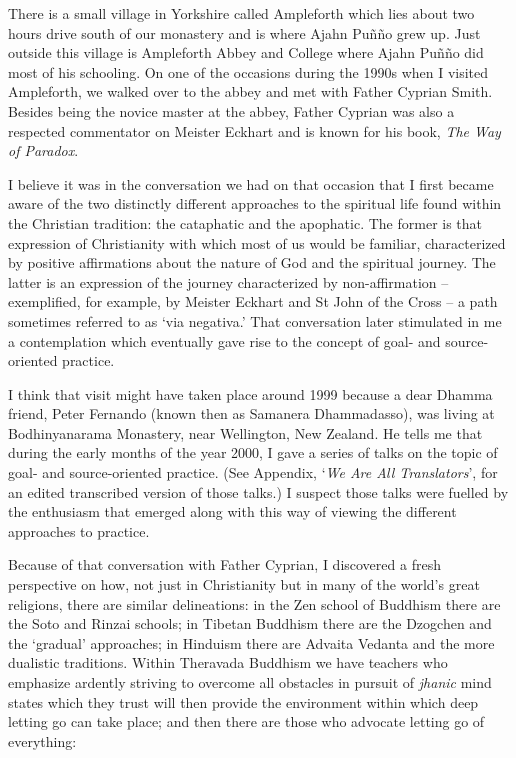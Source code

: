 There is a small village in Yorkshire called Ampleforth which lies about
two hours drive south of our monastery and is where Ajahn Puñño grew up.
Just outside this village is Ampleforth Abbey and College\cite{ampleforth}
where Ajahn Puñño did most of his
schooling. On one of the occasions during the 1990s when I visited
Ampleforth, we walked over to the abbey and met with Father Cyprian
Smith. Besides being the novice master at the abbey, Father Cyprian was
also a respected commentator on Meister Eckhart and is known for his
book, \emph{The Way of Paradox}\cite{paradox}.

I believe it was in the conversation we had on that occasion that I
first became aware of the two distinctly different approaches to the
spiritual life found within the Christian tradition: the
cataphatic and the apophatic\cite{cataphatic}. The former is that expression of
Christianity with which most of us would be familiar, characterized by
positive affirmations about the nature of God and the spiritual journey.
The latter is an expression of the journey characterized by
non-affirmation -- exemplified, for example, by Meister Eckhart and St
John of the Cross -- a path sometimes referred to as `via negativa.'
That conversation later stimulated in me a contemplation which
eventually gave rise to the concept of goal- and source-oriented
practice.

I think that visit might have taken place around 1999 because a dear
Dhamma friend, Peter Fernando (known then as Samanera Dhammadasso), was
living at Bodhinyanarama Monastery, near Wellington, New Zealand. He
tells me that during the early months of the year 2000, I gave a series
of talks on the topic of goal- and source-oriented practice. (See
Appendix, `\emph{We Are All Translators}', for an edited transcribed
version of those talks.) I suspect those talks were fuelled by the
enthusiasm that emerged along with this way of viewing the different
approaches to practice.

Because of that conversation with Father Cyprian, I discovered a fresh
perspective on how, not just in Christianity but in many of the
world's great religions, there are similar delineations: in the Zen school of Buddhism
there are the Soto and Rinzai schools; in Tibetan Buddhism there are the
Dzogchen and the `gradual' approaches; in Hinduism there are Advaita
Vedanta and the more dualistic traditions. Within Theravada Buddhism we
have teachers who emphasize ardently striving to overcome all obstacles
in pursuit of \emph{jhanic} mind states which they trust will then
provide the environment within which deep letting go can take place; and
then there are those who advocate letting go of everything:

